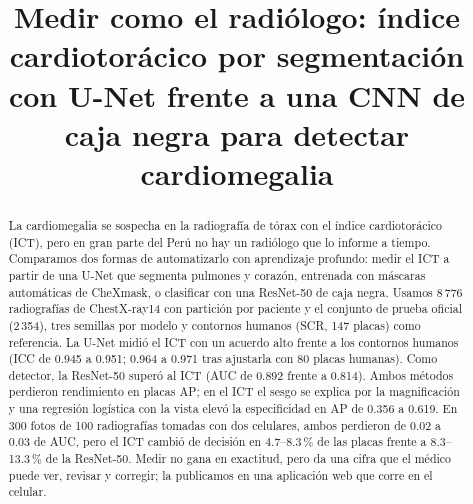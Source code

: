 \documentclass[conference]{IEEEtran}
\begin{document}
\title{Medir como el radiólogo: índice cardiotorácico por segmentación con U-Net frente a una CNN de caja negra para
detectar cardiomegalia}

\author{
}

\maketitle

\begin{abstract}
La cardiomegalia se sospecha en la radiografía de tórax con el índice cardiotorácico (ICT), pero en gran parte del
Perú no hay un radiólogo que lo informe a tiempo. Comparamos dos formas de automatizarlo con aprendizaje profundo:
medir el ICT a partir de una U-Net que segmenta pulmones y corazón, entrenada con máscaras automáticas de CheXmask, o
clasificar con una ResNet-50 de caja negra. Usamos 8\,776 radiografías de ChestX-ray14 con partición por paciente y el
conjunto de prueba oficial (2\,354), tres semillas por modelo y contornos humanos (SCR, 147 placas) como referencia.
La U-Net midió el ICT con un acuerdo alto frente a los contornos humanos (ICC de 0.945 a 0.951; 0.964 a 0.971 tras
ajustarla con 80 placas humanas). Como detector, la ResNet-50 superó al ICT (AUC de 0.892 frente a 0.814). Ambos
métodos perdieron rendimiento en placas AP; en el ICT el sesgo se explica por la magnificación y una regresión
logística con la vista elevó la especificidad en AP de 0.356 a 0.619. En 300 fotos de 100 radiografías tomadas con dos
celulares, ambos perdieron de 0.02 a 0.03 de AUC, pero el ICT cambió de decisión en 4.7--8.3\,\% de las placas frente a
8.3--13.3\,\% de la ResNet-50. Medir no gana en exactitud, pero da una cifra que el médico puede ver, revisar y
corregir; la publicamos en una aplicación web que corre en el celular.
\end{abstract}
\end{document}
